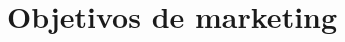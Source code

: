 \section{\textbf{Objetivos de marketing}}
\label{sec: Objetivos de marketing}


\begin{commentA}

\par \end{commentA}

